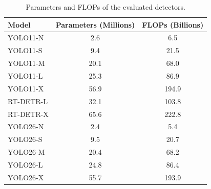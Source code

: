 \begin{table}[t]
\centering
\caption{Parameters and FLOPs of the evaluated detectors.}
\label{tab:models}
\scriptsize
\setlength{\tabcolsep}{4pt}
\begin{tabular}{lcc}
\toprule
Model & Parameters (Millions) & FLOPs (Billions) \\
\midrule
YOLO11-N  & 2.6 & 6.5 \\
YOLO11-S  & 9.4 & 21.5 \\
YOLO11-M  & 20.1 & 68.0 \\
YOLO11-L  & 25.3 & 86.9 \\
YOLO11-X  & 56.9 & 194.9 \\
\midrule
RT-DETR-L & 32.1 & 103.8 \\
RT-DETR-X & 65.6 & 222.8 \\
\midrule
YOLO26-N  & 2.4 & 5.4 \\
YOLO26-S  & 9.5 & 20.7 \\
YOLO26-M  & 20.4 & 68.2 \\
YOLO26-L  & 24.8 & 86.4 \\
YOLO26-X  & 55.7 & 193.9 \\
\bottomrule
\end{tabular}
\end{table}